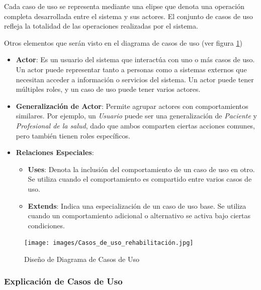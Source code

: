 \documentclass{article}
\begin{document}
Cada caso de uso se representa mediante una elipse que denota una operación completa desarrollada entre el sistema y sus actores. El conjunto de casos de uso refleja la totalidad de las operaciones realizadas por el sistema.

Otros elementos que serán visto en el diagrama de casos de uso (ver figura \ref{fig:requisitos_diagrama})

\begin{itemize}
	\item \textbf{Actor}: Es un usuario del sistema que interactúa con uno o más casos de uso. Un actor puede representar tanto a personas como a sistemas externos que necesitan acceder a información o servicios del sistema. Un actor puede tener múltiples roles, y un caso de uso puede tener varios actores.
	
	\item \textbf{Generalización de Actor}: Permite agrupar actores con comportamientos similares. Por ejemplo, un \textit{Usuario} puede ser una generalización de \textit{Paciente} y \textit{Profesional de la salud}, dado que ambos comparten ciertas acciones comunes, pero también tienen roles específicos.
	
	\item \textbf{Relaciones Especiales}:
	\begin{itemize}
		\item \textbf{Uses}: Denota la inclusión del comportamiento de un caso de uso en otro. Se utiliza cuando el comportamiento es compartido entre varios casos de uso.
		\item \textbf{Extends}: Indica una especialización de un caso de uso base. Se utiliza cuando un comportamiento adicional o alternativo se activa bajo ciertas condiciones.
	\end{itemize}
\end{itemize}

\begin{figure}[h!]
	\begin{center} 
		\texttt{[image: images/Casos\_de\_uso\_rehabilitación.jpg]}
		\caption{Diseño de Diagrama de Casos de Uso}
		\label{fig:requisitos_diagrama}
	\end{center}
\end{figure}

\subsubsection{Explicación de Casos de Uso}
\end{document}
